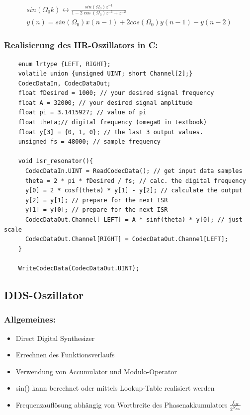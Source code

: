 \documentclass[10pt,a4paper]{article}
\begin{document}
  \begin{mdframed}[style=exercise]
    \begin{align}
    sin(\Omega_0 k) \leftrightarrow \frac{sin(\Omega_0)z^{-1}}{1-2\cos(\Omega_0)z^{-1}+z^{-2}}\\
    y(n) = sin(\Omega_0)x(n-1)+2cos(\Omega_0)y(n-1)-y(n-2)
    \end{align}
  \end{mdframed}

\subsubsection{Realisierung des IIR-Oszillators in C:}
  \begin{verbatim}
    enum lrtype {LEFT, RIGHT};
    volatile union {unsigned UINT; short Channel[2];}
    CodecDataIn, CodecDataOut;
    float fDesired = 1000; // your desired signal frequency
    float A = 32000; // your desired signal amplitude
    float pi = 3.1415927; // value of pi
    float theta;// digital frequency (omega0 in textbook)
    float y[3] = {0, 1, 0}; // the last 3 output values.
    unsigned fs = 48000; // sample frequency

    void isr_resonator(){
      CodecDataIn.UINT = ReadCodecData(); // get input data samples
      theta = 2 * pi * fDesired / fs; // calc. the digital frequency
      y[0] = 2 * cosf(theta) * y[1] - y[2]; // calculate the output
      y[2] = y[1]; // prepare for the next ISR
      y[1] = y[0]; // prepare for the next ISR
      CodecDataOut.Channel[ LEFT] = A * sinf(theta) * y[0]; // just scale
      CodecDataOut.Channel[RIGHT] = CodecDataOut.Channel[LEFT];
    }

    WriteCodecData(CodecDataOut.UINT);  
  \end{verbatim}

\subsection{DDS-Oszillator}
\subsubsection{Allgemeines:}
\begin{itemize}
  \item Direct Digital Synthesizer
  \item Errechnen des Funktionsverlaufs
  \item Verwendung von Accumulator und Modulo-Operator
  \item sin() kann berechnet oder mittels Lookup-Table realisiert werden
  \item Frequenzauflösung abhängig von Wortbreite des Phasenakkumulators $\frac{f_{clk}}{2^{N_{Bits}}}$
\end{itemize}
\end{document}
